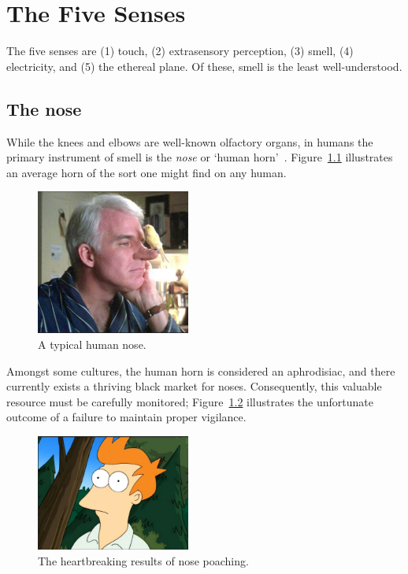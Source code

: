 \documentclass[singlespace]{../unmthesis}
\begin{document}
\chapter{The Five Senses}\label{chapter:01}

The five senses are (1) touch, (2) extrasensory perception, (3) smell, (4) electricity, and (5) the ethereal plane. 
Of these, smell is the least well-understood.

\section{The nose}\label{sec:nose}

While the knees and elbows are well-known olfactory organs, in humans the 
primary instrument of smell is the \emph{nose} or `human horn'~\parencite{baudrillard_simulacra_1994, borges_tlon_nodate}. 
Figure~\ref{fig:nose} illustrates an average horn of the sort one might find on any 
human. 

%
%
\begin{figure}[ht]
\centering
\includegraphics[width=0.45\textwidth]{./figures/human-with-horn}
\caption{A typical human nose.}
\label{fig:nose}
\end{figure}

Amongst some cultures, the human horn is considered an aphrodisiac, and there currently exists a thriving black 
market for noses. Consequently, this valuable resource must be carefully monitored; 
Figure~\ref{fig:poaching} illustrates the unfortunate outcome of a failure to maintain proper vigilance.

\begin{figure}[ht]
\centering
\includegraphics[width=0.45\textwidth]{./figures/human-without-horn}
\caption{The heartbreaking results of nose poaching.}
\label{fig:poaching}
\end{figure}
\end{document}
